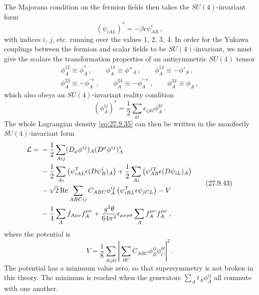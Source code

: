 The Majorana condition on the fermion fields then takes the
\(SU(4)\)-invariant form
\begin{equation}
  (\psi_{iAL})^*=-\beta\epsilon\psi^i_{AR}\,,
  \tag{27.9.40}\label{eq:27.9.40}
\end{equation}
with indices \(i\), \(j\), etc. running over the values 1, 2, 3, 4. In order
for the Yukawa couplings between the fermion and scalar fields to be
\(SU(4)\)-invariant, we must give the scalars the transformation properties
of an antisymmetric \(SU(4)\) tensor
\begin{equation}
  \begin{gathered}
  \phi_A^{12}\equiv\phi_A^*\,,
  \qquad
  \phi_A^{13}\equiv\phi''_A\,,
  \qquad
  \phi_A^{14}\equiv-\phi'_A\,,
  \\
  \phi_A^{23}\equiv-\phi_A^{\prime *}\,,
  \qquad
  \phi_A^{24}\equiv-\phi_A^{\prime\prime *}\,,
  \qquad
  \phi_A^{34}\equiv\phi_A\,,
  \end{gathered}
  \tag{27.9.41}\label{eq:27.9.41}
\end{equation}
which also obeys an \(SU(4)\)-invariant reality condition
\begin{equation}
  (\phi_A^{ij})^*
  =\frac12\sum_{kl}\epsilon_{ijkl}\phi_A^{kl}\,.
  \tag{27.9.42}\label{eq:27.9.42}
\end{equation}
The whole Lagrangian density \eqref{eq:27.9.35} can then be written in the
manifestly \(SU(4)\)-invariant form
\begin{equation}
  \begin{aligned}
  \mathcal{L}={}&
  -\frac12\sum_{Aij}(D_\mu\phi^{ij})_A(D^\mu\phi^{ij})_A^*
  \\
  &-\frac12\sum_{Ai}
    \left(\psi_{iAL}^{\mathsf T}\epsilon(\sl{D}\psi_R^i)_A\right)
  +\frac12\sum_{Ai}
    \left(\psi_{AR}^{i\mathrm T}\epsilon(\sl{D}\psi_{iL})_A\right)
  \\
  &-\sqrt{2}\operatorname{Re}\sum_{ABCij}C_{ABC}\phi_A^{ij}
    \left(\psi_{iBL}^{\mathsf T}\epsilon\psi_{jCL}\right)-V
  \\
  &-\frac14\sum_Af_{A\mu\nu}f_A^{\mu\nu}
  +\frac{g^2\theta}{64\pi^2}\epsilon_{\mu\nu\rho\sigma}
    \sum_Af_A^{\mu\nu}f_A^{\rho\sigma}\,,
  \end{aligned}
  \tag{27.9.43}\label{eq:27.9.43}
\end{equation}
where the potential is
\begin{equation}
  V=\frac18\sum_{Aijkl}\left|
    \sum_{BC}C_{ABC}\phi_B^{ij}\phi_C^{kl}
  \right|^2\,.
  \tag{27.9.44}\label{eq:27.9.44}
\end{equation}
The potential has a minimum value zero, so that supersymmetry is not broken
in this theory. The minimum is reached when the generators
\(\sum_A t_A\phi_A^{ij}\) all commute with one another.

